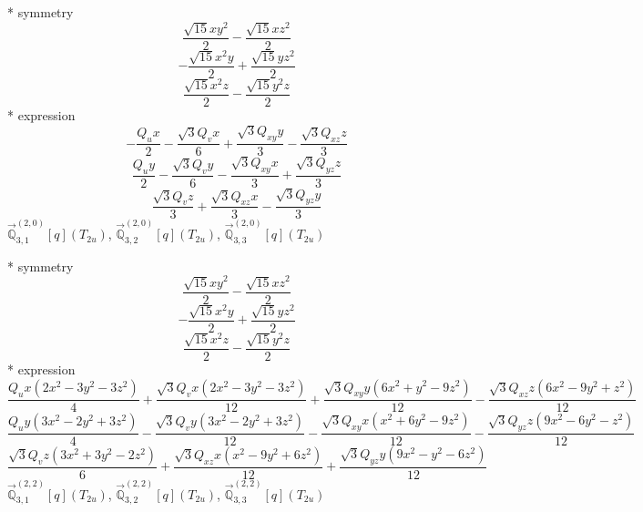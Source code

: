 \documentclass[fleqn,8pt]{jsarticle}
\begin{document}
\noindent\quad ** symmetry
\begin{dmath*}
\frac{\sqrt{15} x y^{2}}{2} - \frac{\sqrt{15} x z^{2}}{2}
\end{dmath*}
\begin{dmath*}
- \frac{\sqrt{15} x^{2} y}{2} + \frac{\sqrt{15} y z^{2}}{2}
\end{dmath*}
\begin{dmath*}
\frac{\sqrt{15} x^{2} z}{2} - \frac{\sqrt{15} y^{2} z}{2}
\end{dmath*}
\noindent\quad ** expression
\begin{dmath*}
- \frac{Q_{u} x}{2} - \frac{\sqrt{3} Q_{v} x}{6} + \frac{\sqrt{3} Q_{xy} y}{3} - \frac{\sqrt{3} Q_{xz} z}{3}
\end{dmath*}
\begin{dmath*}
\frac{Q_{u} y}{2} - \frac{\sqrt{3} Q_{v} y}{6} - \frac{\sqrt{3} Q_{xy} x}{3} + \frac{\sqrt{3} Q_{yz} z}{3}
\end{dmath*}
\begin{dmath*}
\frac{\sqrt{3} Q_{v} z}{3} + \frac{\sqrt{3} Q_{xz} x}{3} - \frac{\sqrt{3} Q_{yz} y}{3}
\end{dmath*}
\noindent\quad $\vec{\mathbb{Q}}_{3,1}^{(2,0)}[q](T_{2u})$, $\vec{\mathbb{Q}}_{3,2}^{(2,0)}[q](T_{2u})$, $\vec{\mathbb{Q}}_{3,3}^{(2,0)}[q](T_{2u})$

\noindent\quad ** symmetry
\begin{dmath*}
\frac{\sqrt{15} x y^{2}}{2} - \frac{\sqrt{15} x z^{2}}{2}
\end{dmath*}
\begin{dmath*}
- \frac{\sqrt{15} x^{2} y}{2} + \frac{\sqrt{15} y z^{2}}{2}
\end{dmath*}
\begin{dmath*}
\frac{\sqrt{15} x^{2} z}{2} - \frac{\sqrt{15} y^{2} z}{2}
\end{dmath*}
\noindent\quad ** expression
\begin{dmath*}
\frac{Q_{u} x \left(2 x^{2} - 3 y^{2} - 3 z^{2}\right)}{4} + \frac{\sqrt{3} Q_{v} x \left(2 x^{2} - 3 y^{2} - 3 z^{2}\right)}{12} + \frac{\sqrt{3} Q_{xy} y \left(6 x^{2} + y^{2} - 9 z^{2}\right)}{12} - \frac{\sqrt{3} Q_{xz} z \left(6 x^{2} - 9 y^{2} + z^{2}\right)}{12}
\end{dmath*}
\begin{dmath*}
\frac{Q_{u} y \left(3 x^{2} - 2 y^{2} + 3 z^{2}\right)}{4} - \frac{\sqrt{3} Q_{v} y \left(3 x^{2} - 2 y^{2} + 3 z^{2}\right)}{12} - \frac{\sqrt{3} Q_{xy} x \left(x^{2} + 6 y^{2} - 9 z^{2}\right)}{12} - \frac{\sqrt{3} Q_{yz} z \left(9 x^{2} - 6 y^{2} - z^{2}\right)}{12}
\end{dmath*}
\begin{dmath*}
\frac{\sqrt{3} Q_{v} z \left(3 x^{2} + 3 y^{2} - 2 z^{2}\right)}{6} + \frac{\sqrt{3} Q_{xz} x \left(x^{2} - 9 y^{2} + 6 z^{2}\right)}{12} + \frac{\sqrt{3} Q_{yz} y \left(9 x^{2} - y^{2} - 6 z^{2}\right)}{12}
\end{dmath*}
\noindent\quad $\vec{\mathbb{Q}}_{3,1}^{(2,2)}[q](T_{2u})$, $\vec{\mathbb{Q}}_{3,2}^{(2,2)}[q](T_{2u})$, $\vec{\mathbb{Q}}_{3,3}^{(2,2)}[q](T_{2u})$
\end{document}
